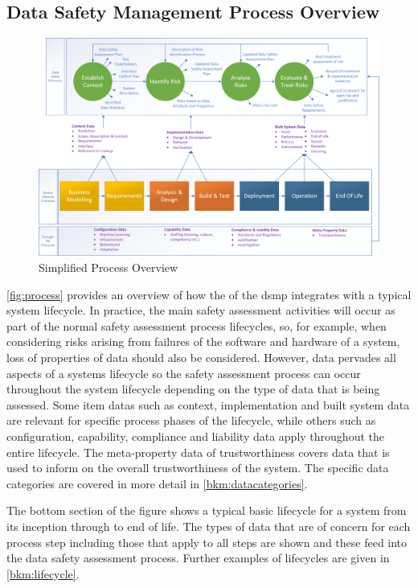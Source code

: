 \subsection{Data Safety Management Process Overview}
\begin{figure}[hb]
\centering
\includegraphics[angle=90,scale=0.7]{images/process_diagram}
\caption{Simplified Process Overview}
\label{fig:process}
\end{figure}

\autoref{fig:process} provides an overview of how the of the \gls{dsmp}
integrates with a typical system lifecycle. In practice, the main \gls{safety assessment} activities will
occur as part of the normal safety assessment process lifecycles, so, for example, when considering risks arising
from failures of the software and hardware of a system, loss of properties of data should also be
considered. However, data pervades all aspects of a systems lifecycle so the \gls{safety assessment}
process can occur throughout the system lifecycle depending on the type of data that is being
assessed. Some \glspl{item data} such as context, implementation and built system data are relevant for
specific process phases of the lifecycle, while others such as configuration, capability, compliance and
liability data apply throughout the entire lifecycle. The meta-property data of trustworthiness
covers data that is used to inform on the overall trustworthiness of the system. The specific data
categories are covered in more detail in \autoref{bkm:datacategories}.

The bottom section of the figure shows a typical basic lifecycle for a system from its inception
through to end of life. The types of data that are of concern for each process step including those
that apply to all steps are shown and these feed into the data \gls{safety assessment} process. Further
examples of lifecycles are given in \autoref{bkm:lifecycle}.
\cbend

